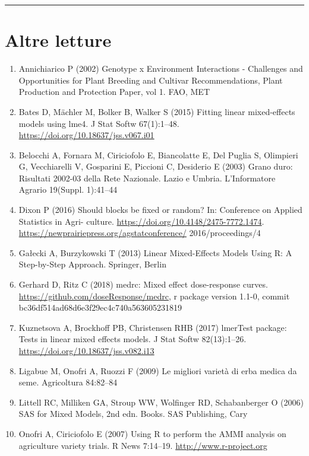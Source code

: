 \documentclass[
  12pt,
]{book}
\providecommand{\tightlist}{%
  \setlength{\itemsep}{0pt}\setlength{\parskip}{0pt}}
\begin{document}
\begin{center}\rule{0.5\linewidth}{0.5pt}\end{center}

\hypertarget{altre-letture-11}{%
\section{Altre letture}\label{altre-letture-11}}

\begin{enumerate}
\def\labelenumi{\arabic{enumi}.}
\tightlist
\item
  Annichiarico P (2002) Genotype x Environment Interactions - Challenges and Opportunities for Plant Breeding and Cultivar Recommendations, Plant Production and Protection Paper, vol 1. FAO, MET
\item
  Bates D, Mächler M, Bolker B, Walker S (2015) Fitting linear mixed-effects models using lme4. J Stat Softw 67(1):1--48. \url{https://doi.org/10.18637/jss.v067.i01}
\item
  Belocchi A, Fornara M, Ciriciofolo E, Biancolatte E, Del Puglia S, Olimpieri G, Vecchiarelli V, Gosparini E, Piccioni C, Desiderio E (2003) Grano duro: Risultati 2002-03 della Rete Nazionale. Lazio e Umbria. L'Informatore Agrario 19(Suppl. 1):41--44
\item
  Dixon P (2016) Should blocks be fixed or random? In: Conference on Applied Statistics in Agri- culture. \url{https://doi.org/10.4148/2475-7772.1474}. \url{https://newprairiepress.org/agstatconference/} 2016/proceedings/4
\item
  Gałecki A, Burzykowski T (2013) Linear Mixed-Effects Models Using R: A Step-by-Step Approach. Springer, Berlin
\item
  Gerhard D, Ritz C (2018) medrc: Mixed effect dose-response curves. \url{https://github.com/doseResponse/medrc}, r package version 1.1-0, commit bc36df514ad68d6e3f29ec4c740a563605231819
\item
  Kuznetsova A, Brockhoff PB, Christensen RHB (2017) lmerTest package: Tests in linear mixed effects models. J Stat Softw 82(13):1--26. \url{https://doi.org/10.18637/jss.v082.i13}
\item
  Ligabue M, Onofri A, Ruozzi F (2009) Le migliori varietà di erba medica da seme. Agricoltura 84:82--84
\item
  Littell RC, Milliken GA, Stroup WW, Wolfinger RD, Schabanberger O (2006) SAS for Mixed Models, 2nd edn. Books. SAS Publishing, Cary
\item
  Onofri A, Ciriciofolo E (2007) Using R to perform the AMMI analysis on agriculture variety trials. R News 7:14--19. \url{http://www.r-project.org}

\end{enumerate}
\end{document}
